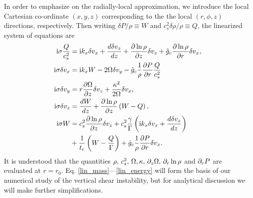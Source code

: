 In order to emphasize on the radially-local approximation, we
introduce the local Cartesian co-ordinate $(x,y,z)$ corresponding to
the the local $(r,\phi,z)$ directions, respectively. Then writing
$\delta P /\rho \equiv W$ and $c_s^2\delta\rho/\rho\equiv Q$, the
linearized system of equations are 
\begin{align}
  \mathrm{i}\sigma \frac{Q}{c_s^2}  &=  \mathrm{i} k_x \delta v_x + \frac{d\delta
    v_z}{dz} + \frac{\partial\ln{\rho}}{\partial z}\delta v_z + \hat{g}_c
  \frac{\partial\ln{\rho}}{\partial r} \delta v_x,\label{lin_mass}\\
  \mathrm{i}\sigma \delta v_x  &= \mathrm{i} k_x W - 2\Omega\delta v_y -
  \hat{g}_c\frac{1}{\rho}\frac{\partial P}{\partial r}\frac{Q}{c_s^2}\label{lin_vx}\\
   \mathrm{i} \sigma\delta v_y &= r\frac{\partial \Omega}{\partial z}\delta v_z +
  \frac{\kappa^2}{2\Omega}\delta v_x, \label{lin_vy}\\
   \mathrm{i}\sigma\delta v_z &= \frac{dW}{dz} +
  \frac{\partial\ln{\rho}}{\partial z}\left(W-Q\right), \label{lin_vz}\\
  \mathrm{i} \sigma W &= c_s^2\frac{\partial\ln{\rho}}{\partial z}\delta v_z +
  c_s^2\frac{\gamma}{\Gamma} \left(\mathrm{i} k_x\delta v_x + \frac{d\delta
      v_z}{dz}\right) \notag\\
  &+ \frac{1}{t_c}\left(W - \frac{Q}{\Gamma}\right) +
  \hat{g}_c\frac{1}{\rho}\frac{\partial P}{\partial r}\delta v_x.\label{lin_energy}
\end{align}
It is understood that the quantities $\rho,\,c_s^2,\,\Omega,\kappa,\, 
\partial_z\Omega,\, \partial_r\ln{\rho} $ and $ \partial_r P$ are evaluated at $r=r_0$.   
Eq. \ref{lin_mass}---\ref{lin_energy} will form the basis of our numerical
study of the vertical shear instability, but for analytical discussion
we will make further simplifications. 











